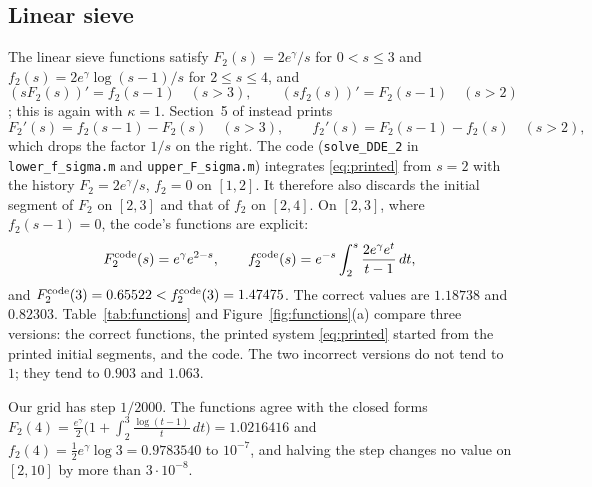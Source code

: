 \documentclass[11pt,a4paper]{amsart}
\theoremstyle{remark}
\numberwithin{equation}{section}
\newcommand{\eg}{e^{\gamma}}
\begin{document}
\subsection{Linear sieve}
The linear sieve functions satisfy $F_2(s)=2\eg/s$ for $0<s\le3$ and $f_2(s)=2\eg\log(s-1)/s$ for $2\le s\le4$, and
\begin{equation}\label{eq:lin}
(sF_2(s))'=f_2(s-1)\quad(s>3),\qquad (sf_2(s))'=F_2(s-1)\quad(s>2)
\end{equation}
\cite[(12.1)--(12.2)]{FI}; this is again \cite[Lemma~3.6]{NX} with $\kappa=1$. Section~5 of \cite{NX} instead
prints
\begin{equation}\label{eq:printed}
F_2'(s)=f_2(s-1)-F_2(s)\quad(s>3),\qquad f_2'(s)=F_2(s-1)-f_2(s)\quad(s>2),
\end{equation}
which drops the factor $1/s$ on the right. The code (\texttt{solve\_DDE\_2} in \texttt{lower\_f\_sigma.m} and
\texttt{upper\_F\_sigma.m}) integrates \eqref{eq:printed} from $s=2$ with the history $F_2=2\eg/s$, $f_2=0$ on
$[1,2]$. It therefore also discards the initial segment of $F_2$ on $[2,3]$ and that of $f_2$ on $[2,4]$. On
$[2,3]$, where $f_2(s-1)=0$, the code's functions are explicit:
\[
F_2^{\rm code}(s)=\eg e^{2-s},\qquad f_2^{\rm code}(s)=e^{-s}\int_2^s\frac{2\eg e^t}{t-1}\,dt,
\]
and $F_2^{\rm code}(3)=0.65522<f_2^{\rm code}(3)=1.47475$. The correct values are $1.18738$ and $0.82303$.
Table~\ref{tab:functions} and Figure~\ref{fig:functions}(a) compare three versions: the correct functions, the
printed system \eqref{eq:printed} started from the printed initial segments, and the code. The two incorrect
versions do not tend to $1$; they tend to $0.903$ and $1.063$.

Our grid has step $1/2000$. The functions agree with the closed forms
$F_2(4)=\frac{\eg}2\bigl(1+\int_2^3\frac{\log(t-1)}t\,dt\bigr)=1.0216416$ and $f_2(4)=\frac12\eg\log3=0.9783540$ to
$10^{-7}$, and halving the step changes no value on $[2,10]$ by more than $3\cdot10^{-8}$.
\end{document}
